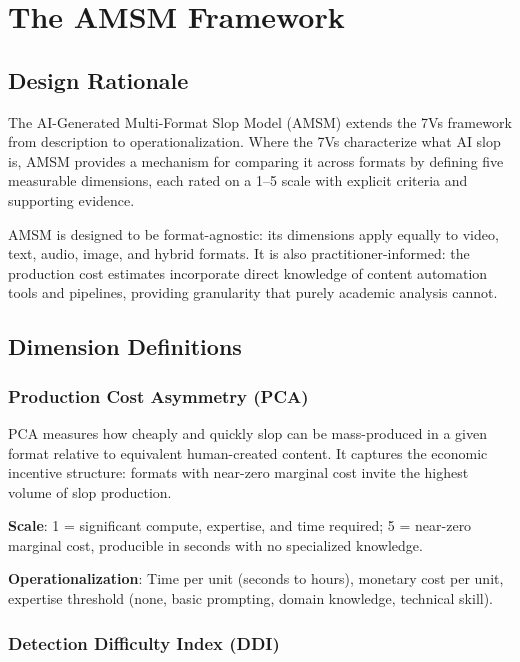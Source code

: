 \documentclass[12pt,a4paper]{article}
\begin{document}
\section{The AMSM Framework}
\label{sec:framework}

\subsection{Design Rationale}

The AI-Generated Multi-Format Slop Model (AMSM) extends the 7Vs framework \parencite{MadsenPuyt2025} from description to operationalization. Where the 7Vs characterize what AI slop is, AMSM provides a mechanism for comparing it across formats by defining five measurable dimensions, each rated on a 1--5 scale with explicit criteria and supporting evidence.

AMSM is designed to be format-agnostic: its dimensions apply equally to video, text, audio, image, and hybrid formats. It is also practitioner-informed: the production cost estimates incorporate direct knowledge of content automation tools and pipelines, providing granularity that purely academic analysis cannot.

\subsection{Dimension Definitions}

\subsubsection{Production Cost Asymmetry (PCA)}

PCA measures how cheaply and quickly slop can be mass-produced in a given format relative to equivalent human-created content. It captures the economic incentive structure: formats with near-zero marginal cost invite the highest volume of slop production.

\textbf{Scale}: 1 = significant compute, expertise, and time required; 5 = near-zero marginal cost, producible in seconds with no specialized knowledge.

\textbf{Operationalization}: Time per unit (seconds to hours), monetary cost per unit, expertise threshold (none, basic prompting, domain knowledge, technical skill).

\subsubsection{Detection Difficulty Index (DDI)}
\end{document}

